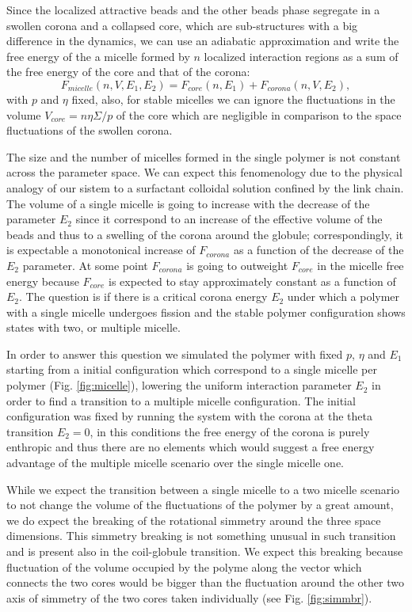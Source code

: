 \documentclass[12pt,a4paper,notitlepage]{article}
\begin{document}
Since the localized attractive beads and the other beads phase
segregate in a swollen corona and a collapsed core, which are
sub-structures with a big difference in the dynamics, we can
use an adiabatic approximation and write the free energy of the
a micelle formed by $n$ localized interaction regions as a sum of the
free energy of the core and that of the corona:
\begin{equation}
F_{micelle}(n, V, E_1, E_2) = F_{core}(n, E_1) + F_{corona}(n, V, E_2),
\end{equation}
with $p$ and $\eta$ fixed, also, for stable micelles we can ignore the
fluctuations in the volume $V_{core}=n \eta \Sigma / p$ of the core
which are negligible in comparison to the space fluctuations of the
swollen corona.

The size and the number of micelles formed in the
single polymer is not constant across the parameter space. We can
expect this fenomenology due to the physical analogy of our sistem to
a surfactant colloidal solution confined by the link chain. The volume
of a single micelle is going to increase with the decrease of the
parameter $E_2$ since it correspond to an increase of the effective
volume of the beads and thus to a swelling of the corona around the
globule; correspondingly, it is expectable a monotonical increase of
$F_{corona}$ as a function of the decrease of the $E_2$ parameter. At
some point $F_{corona}$ is going to outweight $F_{core}$ in the
micelle free energy because $F_{core}$ is expected to stay
approximately constant as a function of $E_2$. The question is if there
is a critical corona energy $E_2$ under which a polymer with a single
micelle undergoes fission and the stable polymer configuration shows
states with two, or multiple micelle.

In order to answer this question we simulated the polymer with fixed
$p$, $\eta$ and $E_1$ starting from a initial configuration which
correspond to a single micelle per polymer
(Fig. \ref{fig:micelle}), lowering the uniform interaction parameter
$E_2$ in order to find a transition to a multiple micelle
configuration. The initial configuration was fixed by running the
system with the corona at the theta transition $E_2 =0$, in
this conditions the free energy of the corona is purely enthropic and
thus there are no elements which would suggest a free energy advantage
of the multiple micelle scenario over the single micelle one.

While we expect the transition between a single micelle to a two micelle
scenario to not change the volume of the fluctuations of the polymer
by a great amount, we do expect the breaking of the rotational
simmetry around the three space dimensions. This simmetry breaking is
not something unusual in such transition and is present also in the
coil-globule transition. We expect this breaking because fluctuation
of the volume occupied by the polyme along the vector which connects
the two cores would be bigger than the fluctuation around the other
two axis of simmetry of the two cores taken individually (see
Fig. \ref{fig:simmbr}).
\end{document}
